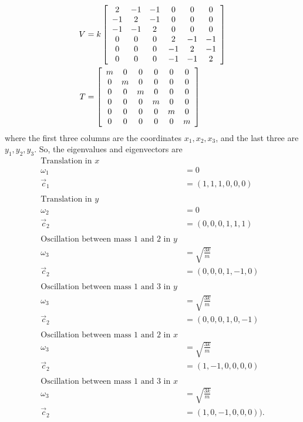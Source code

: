 \documentclass[10pt]{article}
\begin{document}
\begin{align*}
  V &= 
  k\left[
  \begin{array}[h]{c c c c c c}
    2 &-1 &-1 &0 &0 &0\\
    -1 &2 &-1 &0 &0 &0\\
    -1 &-1 &2 &0 &0 &0\\
    0 &0 &0 &2 &-1 &-1\\
    0 &0 &0 &-1 &2 &-1\\
    0 &0 &0 &-1 &-1 &2\\
  \end{array}
  \right]\\
  T &= 
  \left[
  \begin{array}[h]{c c c c c c}
    m &0 &0 &0 &0 &0\\
    0 &m &0 &0 &0 &0\\
    0 &0 &m &0 &0 &0\\
    0 &0 &0 &m &0 &0\\
    0 &0 &0 &0 &m &0\\
    0 &0 &0 &0 &0 &m\\
  \end{array}
  \right]
\end{align*}
where the first three columns are the coordinates $x_1,x_2,x_3$, and the last
three are $y_1,y_2,y_3$.  So, the eigenvalues and eigenvectors are 
\begin{align*}
  \textrm{Translation\ in\ }x\\
  \omega_1 &= 0\\
  \vec{c}_1 &= (1,1,1,0,0,0)\\
  \\
  \textrm{Translation\ in\ }y\\
  \omega_2 &= 0\\
  \vec{c}_2 &= (0,0,0,1,1,1)\\
  \\
  \textrm{Oscillation\ between\ mass\ 1\ and\ 2\ in\ }y\\
  \omega_3 &= \sqrt{\frac{3k}{m}}\\
  \vec{c}_2 &= (0,0,0,1,-1,0)\\
  \\
  \textrm{Oscillation\ between\ mass\ 1\ and\ 3\ in\ }y\\
  \omega_3 &= \sqrt{\frac{3k}{m}}\\
  \vec{c}_2 &= (0,0,0,1,0,-1)\\
  \\
  \textrm{Oscillation\ between\ mass\ 1\ and\ 2\ in\ }x\\
  \omega_3 &= \sqrt{\frac{3k}{m}}\\
  \vec{c}_2 &= (1,-1,0,0,0,0)\\
  \\
  \textrm{Oscillation\ between\ mass\ 1\ and\ 3\ in\ }x\\
  \omega_3 &= \sqrt{\frac{3k}{m}}\\
  \vec{c}_2 &= (1,0,-1,0,0,0)).
\end{align*}
\end{document}
